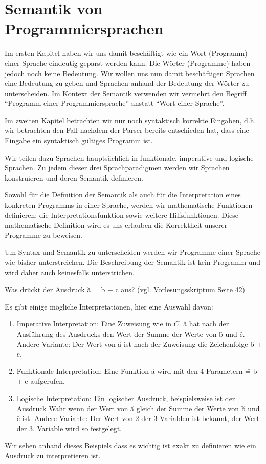 \chapter{Semantik von Programmiersprachen}
Im ersten Kapitel haben wir uns damit beschäftigt wie ein Wort (Programm) einer Sprache eindeutig geparst werden kann.
Die Wörter (Programme) haben jedoch noch keine Bedeutung. Wir wollen uns nun damit beschäftigen
Sprachen eine Bedeutung zu geben und Sprachen anhand der Bedeutung der Wörter 
zu unterscheiden. Im Kontext der Semantik verwenden wir vermehrt den Begriff ``Programm einer Programmiersprache'' anstatt ``Wort einer Sprache''.

Im zweiten Kapitel betrachten wir nur noch syntaktisch korrekte Eingaben, d.h. wir betrachten den Fall nachdem der Parser bereits
entschieden hat, dass eine Eingabe ein syntaktisch gültiges Programm ist.

Wir teilen dazu Sprachen hauptsächlich in funktionale, imperative und logische Sprachen.
Zu jedem dieser drei Sprachparadigmen werden wir Sprachen konstruieren und deren
Semantik definieren.

Sowohl für die Definition der Semantik als auch für die Interpretation eines konkreten Programms
in einer Sprache, werden wir mathematische Funktionen definieren: die Interpretationsfunktion sowie weitere Hilfsfunktionen.
Diese mathematische Definition wird es uns erlauben die Korrektheit unserer Programme
zu beweisen.

Um Syntax und Semantik zu unterscheiden werden wir Programme einer Sprache wie bisher unterstreichen.
Die Beschreibung der Semantik ist kein Programm und wird daher auch keinesfalls unterstrichen.

\begin{bsp}
Was drückt der Ausdruck \u{a = b + c} aus? (vgl. Vorlesungsskriptum Seite 42)

Es gibt einige mögliche Interpretationen, hier eine Auswahl davon:
\begin{enumerate}
\item Imperative Interpretation: Eine Zuweisung wie in $C$. \u{a} hat nach der Ausführung des Ausdrucks den Wert der Summe der Werte von \u{b} und \u{c}.
Andere Variante: Der Wert von \u{a} ist nach der Zuweisung die Zeichenfolge \u{b + c}.
\item Funktionale Interpretation: Eine Funktion \u{a} wird mit den 4 Parametern \u{= b + c} aufgerufen.
\item Logische Interpretation: Ein logischer Ausdruck, beispielsweise ist der Ausdruck Wahr wenn der Wert von \u{a} gleich der Summe der Werte von \u{b} und \u{c} ist.
Andere Variante: Der Wert von 2 der 3 Variablen ist bekannt, der Wert der 3. Variable wird so festgelegt.
\end{enumerate}
Wir sehen anhand dieses Beispiels dass es wichtig ist exakt zu definieren wie ein Ausdruck
zu interpretieren ist.
\end{bsp}

